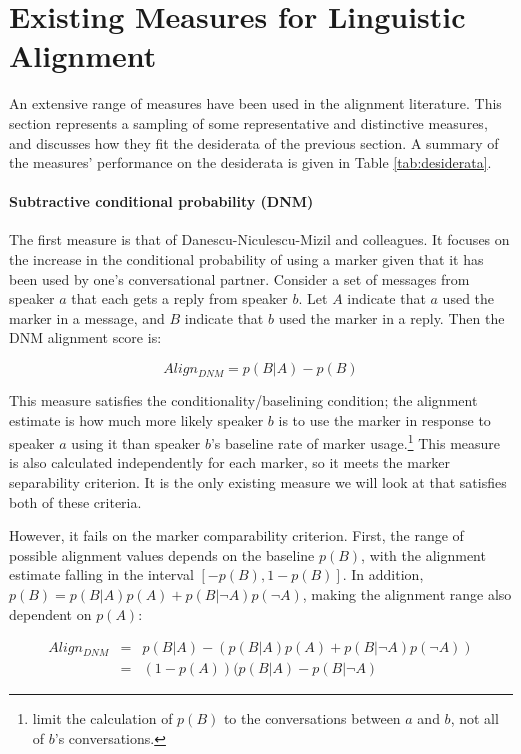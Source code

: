 \documentclass{acm_proc_article-sp}
\begin{document}
\section{Existing Measures for Linguistic Alignment}
An extensive range of measures have been used in the alignment literature.  This section represents a sampling of some representative and distinctive measures, and discusses how they fit the desiderata of the previous section.  A summary of the measures' performance on the desiderata is given in Table \ref{tab:desiderata}. 

\paragraph{Subtractive conditional probability (DNM)} The first measure is that of Danescu-Niculescu-Mizil and colleagues.\cite{DNMGamonDumais2011} It focuses on the increase in the conditional probability of using a marker given that it has been used by one's conversational partner.  Consider a set of messages from speaker $a$ that each gets a reply from speaker $b$.  Let $A$ indicate that $a$ used the marker in a message, and $B$ indicate that $b$ used the marker in a reply.  Then the DNM alignment score is:

\begin{equation}
Align_{DNM} = p(B|A) - p(B)
\end{equation}

This measure satisfies the conditionality/baselining condition; the alignment estimate is how much more likely speaker $b$ is to use the marker in response to speaker $a$ using it than speaker $b$'s baseline rate of marker usage.\footnote{\cite{DNMGamonDumais2011} limit the calculation of $p(B)$ to the conversations between $a$ and $b$, not all of $b$'s conversations.}  This measure is also calculated independently for each marker, so it meets the marker separability criterion.  It is the only existing measure we will look at that satisfies both of these criteria.

However, it fails on the marker comparability criterion.  First, the range of possible alignment values depends on the baseline $p(B)$, with the alignment estimate falling in the interval $[-p(B),1-p(B)]$.  In addition, $p(B) = p(B|A)p(A) + p(B|\neg A)p(\neg A)$, making the alignment range also dependent on $p(A)$:

\begin{align*}
Align_{DNM} & = & p(B|A) - (p(B|A)p(A) + p(B|\neg A)p(\neg A)) \\
& = & (1-p(A))(p(B|A) - p(B|\neg A)
\end{align*} 
\end{document}
